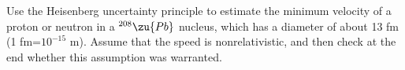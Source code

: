 Use the Heisenberg uncertainty principle to estimate the
minimum velocity of a proton or neutron in a $^{208}\zu{Pb}$
nucleus, which has a diameter of about 13 fm (1 fm=$10^{-15}$
 m). Assume that the speed is nonrelativistic, and then
check at the end whether this assumption was warranted.\answercheck
